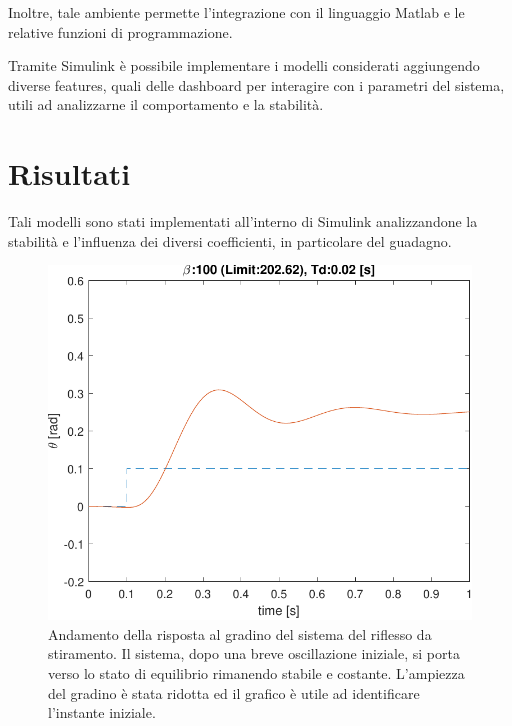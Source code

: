 Inoltre, tale ambiente permette l’integrazione con il linguaggio Matlab e le relative funzioni di programmazione.

Tramite Simulink è possibile implementare i modelli considerati aggiungendo diverse features, quali delle dashboard per interagire con i parametri del sistema, utili ad analizzarne il comportamento e la stabilità.

\section{Risultati}

Tali modelli sono stati implementati all'interno di Simulink analizzandone la stabilità e l'influenza dei diversi coefficienti, in particolare del guadagno.



\begin{figure}[t!]
	\centering
\includegraphics[width=0.95\linewidth]{../code/stretch/figs/result_gain_100_Td_0.02}
\caption{Andamento della risposta al gradino del sistema del riflesso da stiramento. Il sistema, dopo una breve oscillazione iniziale, si porta verso lo stato di equilibrio rimanendo stabile e costante. L'ampiezza del gradino è stata ridotta ed il grafico è utile ad identificare l'instante iniziale.}
\label{fig:beta100}
\end{figure}

